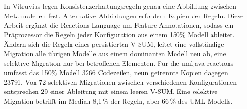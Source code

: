 \Abstract
\label{ch:Zusammenfassung}

In Vitruvius legen Konsistenzerhaltungsregeln genau eine Abbildung zwischen Metamodellen fest.
Alternative Abbildungen erfordern Kopien der Regeln.
Diese Arbeit ergänzt die Reactions Language um Feature Annotationen, sodass ein Präprozessor die Regeln jeder Konfiguration aus einem 150\% Modell ableitet.
Ändern sich die Regeln eines persistierten \mbox{V-SUM}, leitet eine vollständige Migration alle übrigen Modelle aus einem dominanten Modell neu ab, eine selektive Migration nur bei betroffenen Elementen.
Für die umljava-reactions umfasst das 150\% Modell 3266 Codezeilen, neun getrennte Kopien dagegen 23791.
Von 72 selektiven Migrationen zwischen verschiedenen Konfigurationen entsprechen 29 einer Ableitung mit einem leeren V-SUM.
Eine selektive Migration betrifft im Median 8,1\,\% der Regeln, aber 66\,\% des UML-Modells.